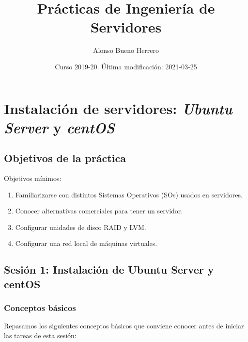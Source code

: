 \documentclass[
]{book}
\title{Prácticas de Ingeniería de Servidores}
\author{Alonso Bueno Herrero}
\date{Curso 2019-20. Última modificación: 2021-03-25}
\providecommand{\tightlist}{%
  \setlength{\itemsep}{0pt}\setlength{\parskip}{0pt}}
\begin{document}
\maketitle

{
\setcounter{tocdepth}{1}
\tableofcontents
}
\hypertarget{p1}{%
\chapter{\texorpdfstring{Instalación de servidores: \textbf{\emph{Ubuntu Server}} y \textbf{\emph{centOS}}}{Instalación de servidores: Ubuntu Server y centOS}}\label{p1}}

\hypertarget{objetivos-de-la-pruxe1ctica}{%
\section{Objetivos de la práctica}\label{objetivos-de-la-pruxe1ctica}}

Objetivos mínimos:

\begin{enumerate}
\def\labelenumi{\arabic{enumi}.}
\tightlist
\item
  Familiarizarse con distintos Sistemas Operativos (SOs) usados en servidores.
\item
  Conocer alternativas comerciales para tener un servidor.
\item
  Configurar unidades de disco RAID y LVM.
\item
  Configurar una red local de máquinas virtuales.
\end{enumerate}

\hypertarget{sesiuxf3n-1-instalaciuxf3n-de-ubuntu-server-y-centos}{%
\section{Sesión 1: Instalación de Ubuntu Server y centOS}\label{sesiuxf3n-1-instalaciuxf3n-de-ubuntu-server-y-centos}}

\hypertarget{conceptos-buxe1sicos}{%
\subsection{Conceptos básicos}\label{conceptos-buxe1sicos}}

Repasamos los siguientes conceptos básicos que conviene conocer antes de iniciar las tareas de esta sesión:
\end{document}
